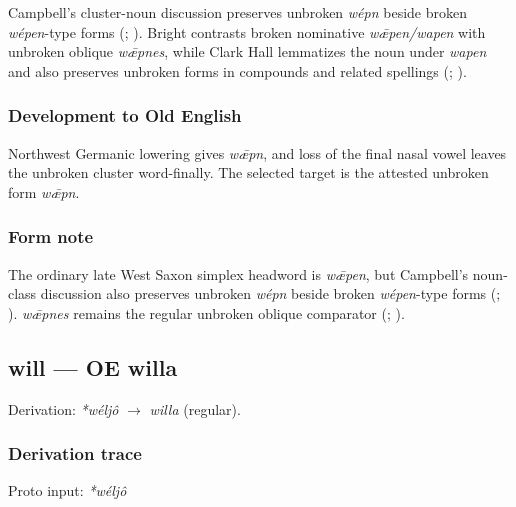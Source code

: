 \documentclass[
  british,
  a4paper,
]{article}
\begin{document}
Campbell's cluster-noun discussion preserves unbroken \emph{wépn} beside
broken \emph{wépen}-type forms (; ). Bright
contrasts broken nominative \emph{wǣpen/wapen} with unbroken oblique
\emph{wǣpnes}, while Clark Hall lemmatizes the noun under \emph{wapen}
and also preserves unbroken forms in compounds and related spellings
(;
).

\subsubsection{Development to Old
English}\label{development-to-old-english-5}

Northwest Germanic lowering gives \emph{wǣpn}, and loss of the final
nasal vowel leaves the unbroken cluster word-finally. The selected
target is the attested unbroken form \emph{wǣpn}.

\subsubsection{Form note}\label{form-note}

The ordinary late West Saxon simplex headword is \emph{wǣpen}, but
Campbell's noun-class discussion also preserves unbroken \emph{wépn}
beside broken \emph{wépen}-type forms
(;
). \emph{wǣpnes} remains the
regular unbroken oblique comparator
(;
).

\subsection{will --- OE willa}\label{will-oe-willa}

Derivation: \emph{*wéljô} \(\rightarrow\) \emph{willa} (regular).

\subsubsection{Derivation trace}\label{derivation-trace-6}

Proto input: \emph{*wéljô}

\begingroup
\setlength{\fboxsep}{6pt}
\end{document}
